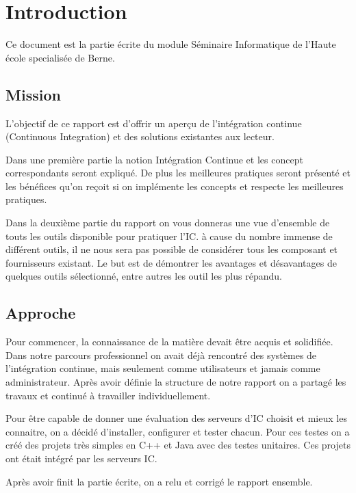 \chapter{Introduction}
\label{chap:introduction}
Ce document est la partie écrite du module Séminaire Informatique de l'Haute école specialisée de Berne.

\section{Mission}
\label{sec:intro_mission}
L'objectif de ce rapport est d'offrir un aperçu de l'intégration continue (Continuous Integration) et des solutions existantes aux lecteur.

Dans une première partie la notion Intégration Continue et les concept correspondants seront expliqué. De plus les meilleures pratiques seront présenté et les bénéfices qu'on reçoit si on implémente les concepts et respecte les meilleures pratiques.

Dans la deuxième partie du rapport on vous donneras une vue d'ensemble de touts les outils disponible pour pratiquer l'IC. à cause du nombre immense de différent outils, il ne nous sera pas possible de considérer tous les composant et fournisseurs existant. Le but est de démontrer les avantages et désavantages de quelques outils sélectionné, entre autres les outil les plus répandu.

\section{Approche}
\label{sec:intro_approche}

Pour commencer, la connaissance de la matière devait être acquis et solidifiée. Dans notre parcours professionnel on avait déjà rencontré des systèmes de l'intégration continue, mais seulement comme utilisateurs et jamais comme administrateur. Après avoir définie la structure de notre rapport on a partagé les travaux et continué à travailler individuellement. 

Pour être capable de donner une évaluation des serveurs d'IC choisit et mieux les connaitre, on a décidé d'installer, configurer et tester chacun. Pour ces testes on a créé des projets très simples en C++ et Java avec des testes unitaires. Ces projets ont était intégré par les serveurs IC.

Après avoir finit la partie écrite, on a relu et corrigé le rapport ensemble.


